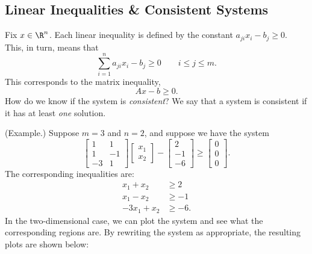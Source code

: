 \documentclass[letterpaper]{article}
\begin{document}
\subsection{Linear Inequalities \& Consistent Systems}
Fix $x \in \R^n$. Each linear inequality is defined by the constant $a_{ji}x_{i} - b_{j} \geq 0$. This, in turn, means that 
\[\sum_{i = 1}^{n} a_{ji}x_{i} - b_{j} \geq 0 \qquad i \leq j \leq m.\]
This corresponds to the matrix inequality,
\[Ax - b \geq 0.\]
How do we know if the system is \emph{consistent}? We say that a system is consistent if it has at least \emph{one} solution.
\begin{mdframed}
    (Example.) Suppose $m = 3$ and $n = 2$, and suppose we have the system
    \[\begin{bmatrix}
        1 & 1 \\ 
        1 & -1 \\ 
        -3 & 1
    \end{bmatrix} \begin{bmatrix}
        x_1 \\ x_2
    \end{bmatrix} - \begin{bmatrix}
        2 \\ -1 \\ -6
    \end{bmatrix} \geq \begin{bmatrix}
        0 \\ 0 \\ 0 
    \end{bmatrix}.\]
    The corresponding inequalities are:
    \begin{equation*}
        \begin{aligned}
            x_1 + x_2 &\geq 2 \\ 
            x_1 - x_2 &\geq -1 \\ 
            -3x_1 + x_2 &\geq -6.
        \end{aligned}
    \end{equation*}
    In the two-dimensional case, we can plot the system and see what the corresponding regions are. By rewriting the system as appropriate, the resulting plots are shown below: 
    \begin{center}

\end{center}
\end{mdframed}
\end{document}
